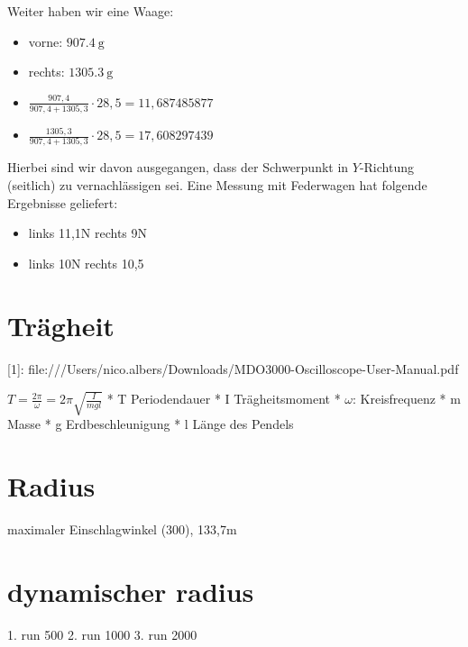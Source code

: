 \documentclass[11pt]{article}
\begin{document}
    Weiter haben wir eine Waage:

    \begin{itemize}
    \item vorne: $\SI{907,4}{\gram}$
    \item rechts: $\SI{1305,3}{\gram}$
    \item $\frac{907,4}{907,4+1305,3}\cdot 28,5=11,687485877$
    \item $\frac{1305,3}{907,4+1305,3}\cdot 28,5=17,608297439$
    \end{itemize}


    Hierbei sind wir davon ausgegangen, dass der Schwerpunkt in $Y$-Richtung (seitlich) zu vernachlässigen sei. Eine Messung mit Federwagen hat folgende Ergebnisse geliefert:
    \begin{itemize}
        \item links 11,1N rechts 9N
        \item links 10N rechts 10,5
    \end{itemize}


\section{Trägheit}
[1]: file:///Users/nico.albers/Downloads/MDO3000-Oscilloscope-User-Manual.pdf


$T=\frac{2\pi}{\omega} = 2\pi\sqrt{\frac{I}{mgl}}$
* T Periodendauer
* I Trägheitsmoment
* $\omega$: Kreisfrequenz
* m Masse
* g Erdbeschleunigung
* l Länge des Pendels



\section{Radius}
maximaler Einschlagwinkel (300), 133,7m


\section{dynamischer radius}
1. run 500
2. run 1000
3. run 2000
\end{document}
